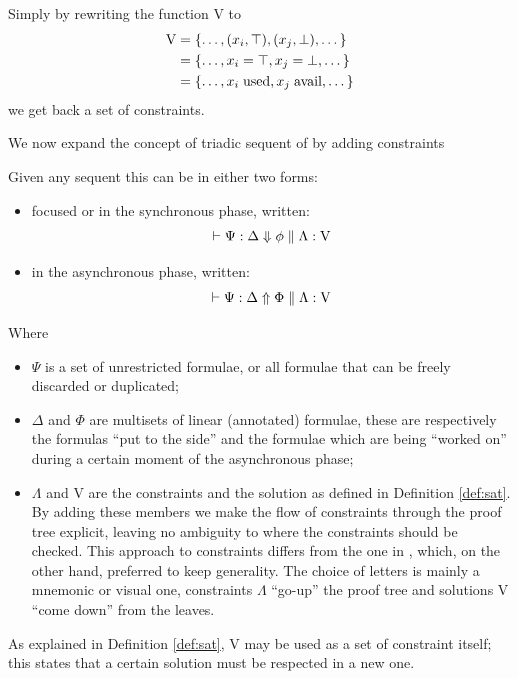 \documentclass[a4paper, 12pt, english]{report}
\begin{document}
\begin{fact}
	\label{fact:ass-trans}
	Simply by rewriting the function V to
	\begin{align*}
		\text{V} &= \{ \dots, (x_i, \top), (x_j, \bot), \dots \} \\
		         &= \{ \dots, x_i = \top, x_j = \bot, \dots \} \\
			 &= \{ \dots, x_i \; \text{used}, x_j \; \text{avail}, \dots \}
	\end{align*}
	we get back a set of constraints.
\end{fact}

We now expand the concept of triadic sequent of \cite{Focusing} by adding constraints
\begin{define}
	Given any sequent this can be in either two forms:
	\begin{itemize}
		\item focused or in the synchronous phase, written:
			$$\vdash \Psi : \Delta \Downarrow \phi \; \Vert \; \Lambda : \text{V}$$
		\item in the asynchronous phase, written:
			$$\vdash \Psi : \Delta \Uparrow \Phi \; \Vert \; \Lambda : \text{V}$$
	\end{itemize}
	Where 
	\begin{itemize}
		\item $\Psi$ is a set of unrestricted formulae, or all formulae that can be freely discarded or duplicated;
		\item $\Delta$ and $\Phi$ are multisets of linear (annotated) formulae, these are respectively the formulas ``put to the side'' and the formulae which are being ``worked on'' during a certain moment of the asynchronous phase;
		\item $\Lambda$ and V are the constraints and the solution as defined in Definition \ref{def:sat}.
			By adding these members we make the flow of constraints through the proof tree explicit, leaving no ambiguity to where the constraints should be checked.
			This approach to constraints differs from the one in \cite{HarlandPym}, which, on the other hand, preferred to keep generality.
			The choice of letters is mainly a mnemonic or visual one, constraints $\Lambda$ ``go-up'' the proof tree and solutions V ``come down'' from the leaves.
	\end{itemize}
\end{define}
As explained in Definition \ref{def:sat}, V may be used as a set of constraint itself; this states that a certain solution must be respected in a new one.
\end{document}
